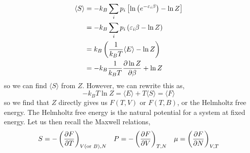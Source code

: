 \documentclass{book}
\begin{document}
\begin{equation}
	\begin{split}
	\langle S \rangle &= -k_B\sum_ip_i\left[\ln\left(e^{-\varepsilon_i\beta}\right)-\ln Z\right]\\
	& = -k_B \sum_ip_i\left(\varepsilon_i\beta - \ln Z\right) \\
	& = k_B \left(\frac{1}{k_B T}\langle E \rangle - \ln Z \right) \\
	& = -k_B\frac{1}{k_BT} \pdv{\ln Z}{\beta} + \ln Z
\end{split}
\end{equation}
so we can find $\langle S \rangle$ from $Z$. However, we can rewrite this as,
\begin{equation}
	-k_BT \ln Z = \langle E \rangle + T \langle S \rangle = \langle F \rangle 
\end{equation}
so we find that $Z$ directly gives us $F(T,V)$ or $F(T,B)$, or the Helmholtz free energy. The Helmholtz free energy is the natural potential for a system at fixed energy. Let us then recall the Maxwell relations,
\begin{align}
	S = -\left(\pdv{F}{T}\right)_{V (\text{or } B), N} && P = -\left(\pdv{F}{V}\right)_{T, N} && \mu = \left(\pdv{F}{N}\right)_{V, T}
\end{align}
\end{document}
